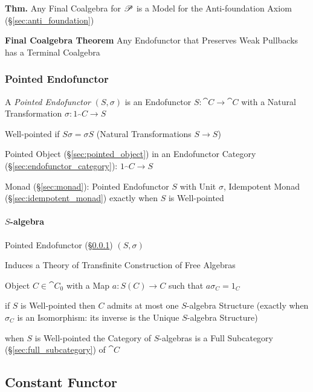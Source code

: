 \textbf{Thm.} Any Final Coalgebra for $\mathscr{P}$ is a Model for the
Anti-foundation Axiom (\S\ref{sec:anti_foundation}) \cite{aczel88}

\textbf{Final Coalgebra Theorem} Any Endofunctor that Preserves Weak
Pullbacks has a Terminal Coalgebra \cite{aczel88}



\subsubsection{Pointed Endofunctor}\label{sec:pointed_endofunctor}

A \emph{Pointed Endofunctor} $(S,\sigma)$ is an Endofunctor $S :
\cat{C} \rightarrow \cat{C}$ with a Natural Transformation $\sigma :
1_\cat{C} \rightarrow S$

Well-pointed if $S \sigma = \sigma S$ (Natural Transformations $S
\rightarrow S$)

Pointed Object (\S\ref{sec:pointed_object}) in an Endofunctor Category
(\S\ref{sec:endofunctor_category}): $1_\cat{C} \rightarrow S$

Monad (\S\ref{sec:monad}): Pointed Endofunctor $S$ with Unit $\sigma$,
Idempotent Monad (\S\ref{sec:idempotent_monad}) exactly when $S$ is
Well-pointed



\paragraph{$S$-algebra}\label{sec:s_algebra}\hfill

Pointed Endofunctor (\S\ref{sec:pointed_endofunctor}) $(S, \sigma)$

Induces a Theory of Transfinite Construction of Free Algebras

Object $C \in \cat{C}_0$ with a Map $a : S(C) \rightarrow C$ such that
$a \sigma_C = 1_C$

if $S$ is Well-pointed then $C$ admits at most one $S$-algebra
Structure (exactly when $\sigma_C$ is an Isomorphism: its inverse is
the Unique $S$-algebra Structure)

when $S$ is Well-pointed the Category of $S$-algebras is a Full
Subcategory (\S\ref{sec:full_subcategory}) of $\cat{C}$



\subsection{Constant Functor}\label{sec:constant_functor}

